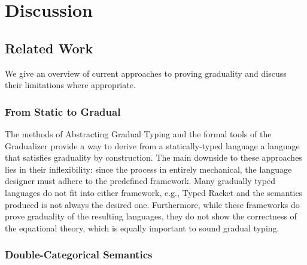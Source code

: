 \section{Discussion}\label{sec:discussion}


\subsection{Related Work}

We give an overview of current approaches to proving graduality and discuss
their limitations where appropriate.

\subsubsection{From Static to Gradual}

The methods of Abstracting Gradual Typing \cite{garcia-clark-tanter2016} and the
formal tools of the Gradualizer \cite{cimini-siek2016} provide a way to derive
from a statically-typed language a language that satisfies graduality by
construction. The main downside to these approaches lies in their inflexibility:
since the process in entirely mechanical, the language designer must adhere to
the predefined framework.  Many gradually typed languages do not fit into either
framework, e.g., Typed Racket \cite{tobin-hochstadt06, tobin-hochstadt08} and
the semantics produced is not always the desired one.
%
Furthermore, while these frameworks do prove graduality of the resulting
languages, they do not show the correctness of the equational theory, which is
equally important to sound gradual typing.

\subsubsection{Double-Categorical Semantics}


